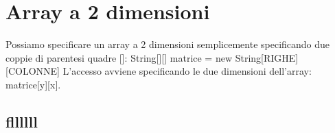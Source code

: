 \documentclass[11pt]{article}
\begin{document}
\section{Array a 2 dimensioni}
\label{sec:orge148ff8}
Possiamo specificare un array a 2 dimensioni semplicemente specificando due coppie di parentesi quadre []:
String[][] matrice = new String[RIGHE][COLONNE]
L'accesso avviene specificando le due dimensioni dell'array:
matrice[y][x].
\subsection{fllllll}
\label{sec:org7265073}
\end{document}
